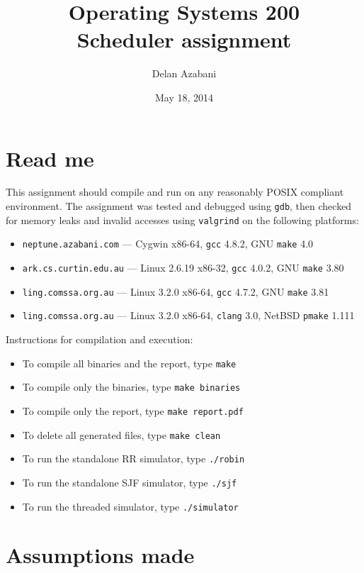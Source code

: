 \documentclass[a4paper,12pt]{article}
\title{Operating Systems 200\\Scheduler assignment}
\date{May 18, 2014}
\author{Delan Azabani}
\begin{document}
\maketitle

\section{Read me}

This assignment should compile and run on any reasonably POSIX compliant
environment. The assignment was tested and debugged using \texttt{gdb}, then
checked for memory leaks and invalid accesses using \texttt{valgrind} on the
following platforms:

\begin{itemize}
	\item \texttt{neptune.azabani.com} ---
	      Cygwin x86-64,
	      \texttt{gcc} 4.8.2,
	      GNU \texttt{make} 4.0
	\item \texttt{ark.cs.curtin.edu.au} ---
	      Linux 2.6.19 x86-32,
	      \texttt{gcc} 4.0.2,
	      GNU \texttt{make} 3.80
	\item \texttt{ling.comssa.org.au} ---
	      Linux 3.2.0 x86-64,
	      \texttt{gcc} 4.7.2,
	      GNU \texttt{make} 3.81
	\item \texttt{ling.comssa.org.au} ---
	      Linux 3.2.0 x86-64,
	      \texttt{clang} 3.0,
	      NetBSD \texttt{pmake} 1.111
\end{itemize}

Instructions for compilation and execution:

\begin{itemize}
	\item To compile all binaries and the report, type \texttt{make}
	\item To compile only the binaries, type \texttt{make binaries}
	\item To compile only the report, type \texttt{make report.pdf}
	\item To delete all generated files, type \texttt{make clean}
	\item To run the standalone RR simulator, type \texttt{./robin}
	\item To run the standalone SJF simulator, type \texttt{./sjf}
	\item To run the threaded simulator, type \texttt{./simulator}
\end{itemize}

\newpage

\section{Assumptions made}
\end{document}
